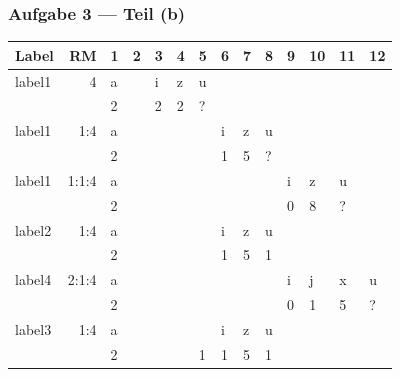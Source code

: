 \documentclass{beamer}
\newcommand{\col}[1]{\textcolor{cdpurple}{#1}}
\begin{document}
\begin{frame} \frametitle{Aufgabe 3 --- Teil (b)}
	\tiny \centering
	\def\arraystretch{0.9}
	\begin{tabular}{|p{1cm}|r||R{0.25cm}|R{0.25cm}|R{0.25cm}|R{0.25cm}|R{0.25cm}|R{0.25cm}|R{0.25cm}|R{0.25cm}|R{0.25cm}|R{0.25cm}|R{0.25cm}|R{0.25cm}|}
		\hline
		Label & RM & 1 & 2 & 3 & 4 & 5 & 6 & 7 & 8 & 9 & 10 & 11 & 12 \\ 
		\hline \hline
		label1 & 4     & a &  & i       & z   & u &   &   &   &   &   &   & \\ 
	           &       & 2 &  & 2       & 2   & ? &   &   &   &   &   &   & \\ \hline
		label1 & 1:4   & a &  &         &     &   & i & z & u &   &   &   & \\ 
		       &       & 2 &  &         &     &   & 1 & \col{5} & ? &   &   &   & \\ \hline
		label1 & 1:1:4 & a &  &         &     &   &   &   &   & i & z & u & \\ 
		       &       & 2 &  &         &     &   &   &   &   & 0 & \col{8} & ? & \\ \hline
		label2 & 1:4   & a &  &         &     &   & i & z & u &   &   &   & \\ 
		       &       & 2 &  &         &     &   & 1 & \col{5} & 1 &   &   &   &\\ \hline
		label4 & 2:1:4 & a &  &         &     &   &   &   &   & i & j & x & u \\ 
		       &       & 2 &  &         &     &   &   &   &   & 0 & 1 & \col{5} & ? \\ \hline
		label3 & 1:4   & a &  &         &     &   & i & z & u &   &   &   & \\ 
		       &       & 2 &  &         &     & 1 & 1 & \col{5} & 1 &   &   &   & \\ \hline
	\end{tabular}


\end{frame}
\end{document}
